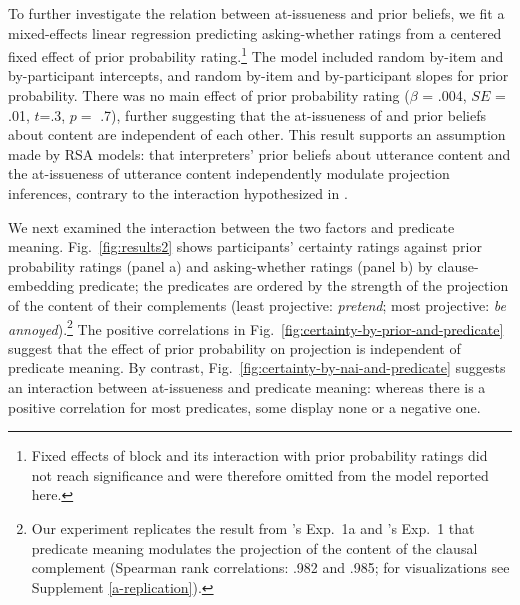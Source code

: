 \documentclass[11pt,fleqn]{article}
\newcommand{\6}{\mbox{$[\hspace*{-.6mm}[$}}
\newcommand{\9}{\mbox{$]\hspace*{-.6mm}]$}}
\newcommand{\citepos}[1]{\citeauthor{#1}'s \citeyear{#1}}
\begin{document}
To further investigate the relation between at-issueness and prior beliefs, we fit a mixed-effects linear regression predicting asking-whether ratings from a centered fixed effect of prior probability rating.\footnote{Fixed effects of block and its interaction with prior probability ratings did not reach significance and were therefore omitted from the model reported here.} The model included random by-item and by-participant intercepts, and random by-item and by-participant slopes for prior probability. There was no main effect of prior probability rating ($\beta$ = .004,  $SE$ = .01, $t$=.3, $p=$ .7), further suggesting that the at-issueness of and prior beliefs about content are independent of each other. This result supports an assumption made by RSA models: that interpreters' prior beliefs about utterance content and the at-issueness of utterance content independently modulate projection inferences, contrary to the interaction hypothesized in \citealt{tonhauser-etal-eval}.

We next examined the interaction between the two factors and predicate meaning. Fig.~\ref{fig:results2} shows participants' certainty ratings against prior probability ratings (panel a) and asking-whether ratings (panel b) by clause-embedding predicate; the predicates are ordered by the strength of the projection of the content of their complements (least projective: {\em pretend}; most projective: {\em be annoyed}).\footnote{Our experiment replicates the result from \citepos{degen-tonhauser-language} Exp.~1a and \citepos{degen-tonhauser-openmind} Exp.~1 that predicate meaning modulates the projection of the content of the clausal complement (Spearman rank correlations: .982 and .985; for visualizations see Supplement \ref{a-replication}). } The positive correlations in Fig.~\ref{fig:certainty-by-prior-and-predicate} suggest that the effect of prior probability on projection is independent of predicate meaning. By contrast,  Fig.~\ref{fig:certainty-by-nai-and-predicate} suggests an interaction between at-issueness and predicate meaning: whereas there is a positive correlation for most predicates, some display none or a negative one. %
\end{document}
